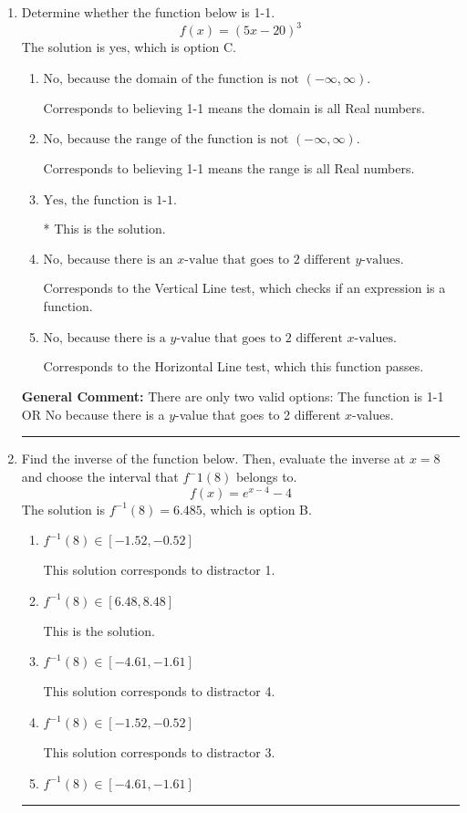 \documentclass{extbook}[14pt]
\newcommand{\litem}[1]{\item #1

\rule{\textwidth}{0.4pt}}
\begin{document}
\begin{enumerate}\litem{
Determine whether the function below is 1-1.
\[ f(x) = (5 x - 20)^3 \]The solution is \( \text{yes} \), which is option C.\begin{enumerate}[label=\Alph*.]
\item \( \text{No, because the domain of the function is not $(-\infty, \infty)$.} \)

Corresponds to believing 1-1 means the domain is all Real numbers.
\item \( \text{No, because the range of the function is not $(-\infty, \infty)$.} \)

Corresponds to believing 1-1 means the range is all Real numbers.
\item \( \text{Yes, the function is 1-1.} \)

* This is the solution.
\item \( \text{No, because there is an $x$-value that goes to 2 different $y$-values.} \)

Corresponds to the Vertical Line test, which checks if an expression is a function.
\item \( \text{No, because there is a $y$-value that goes to 2 different $x$-values.} \)

Corresponds to the Horizontal Line test, which this function passes.
\end{enumerate}

\textbf{General Comment:} There are only two valid options: The function is 1-1 OR No because there is a $y$-value that goes to 2 different $x$-values.
}
\litem{
Find the inverse of the function below. Then, evaluate the inverse at $x = 8$ and choose the interval that $f^-1(8)$ belongs to.
\[ f(x) = e^{x-4}-4 \]The solution is \( f^{-1}(8) = 6.485 \), which is option B.\begin{enumerate}[label=\Alph*.]
\item \( f^{-1}(8) \in [-1.52, -0.52] \)

 This solution corresponds to distractor 1.
\item \( f^{-1}(8) \in [6.48, 8.48] \)

 This is the solution.
\item \( f^{-1}(8) \in [-4.61, -1.61] \)

 This solution corresponds to distractor 4.
\item \( f^{-1}(8) \in [-1.52, -0.52] \)

 This solution corresponds to distractor 3.
\item \( f^{-1}(8) \in [-4.61, -1.61] \)


\end{enumerate}}
\end{enumerate}
\end{document}
